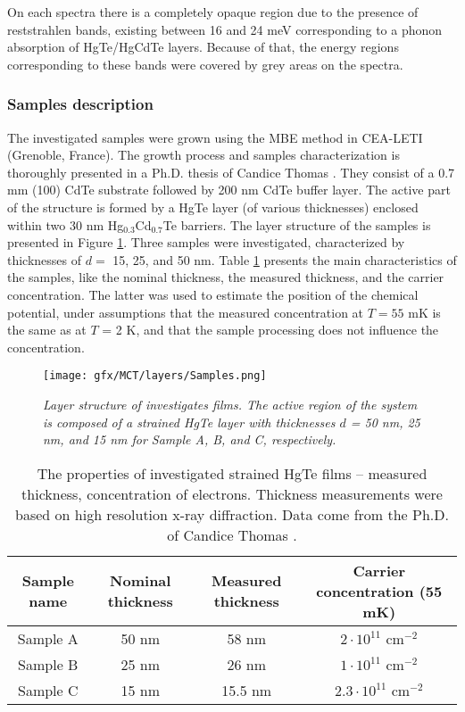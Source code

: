 \documentclass[titlepage,a4paper]{book}
\newcommand{\wciecie}{\quad\phantom{v}}
\begin{document}
On each spectra there is a completely opaque region due to the presence of reststrahlen bands, existing between 16 and 24 meV corresponding to a phonon absorption of HgTe/HgCdTe layers.  Because of that, the energy regions corresponding to these bands were covered by grey areas on the spectra.
 
\subsubsection{Samples description}
\wciecie
The investigated samples were grown using the MBE method in CEA-LETI (Grenoble, France). The growth process and samples characterization is thoroughly presented in a Ph.D. thesis of Candice Thomas \cite{Thomas_PhD}. They consist of a 0.7 mm (100) CdTe substrate followed by 200 nm CdTe buffer layer. The active part of the structure is formed by a HgTe layer (of various thicknesses) enclosed within two 30 nm Hg$_{0.3}$Cd$_{0.7}$Te barriers. The layer structure of the samples is presented in Figure \ref{fig:Samples_layers}. Three samples were investigated, characterized by thicknesses of $d =$ 15, 25, and 50 nm. Table \ref{tab:MCT_films_properties} presents the main characteristics of the samples, like the nominal thickness, the measured thickness, and the carrier concentration. The latter was used to estimate the position of the chemical potential, under assumptions that the measured concentration at $T = 55$ mK is the same as at $T$ = 2 K, and that the sample processing does not influence the concentration.

\begin{figure}[ht]
	\centering
	\texttt{[image: gfx/MCT/layers/Samples.png]}
	\vspace{-10pt}
	\caption{\textit{Layer structure of investigates films. The active region of the system is composed of a strained HgTe layer with thicknesses $d$ = 50 nm, 25 nm, and 15 nm for Sample A, B, and C, respectively.}}
	\label{fig:Samples_layers}
\end{figure} 

\begin{table}[H]
\label{tab:MCT_films_properties}
\caption{The properties of investigated strained HgTe films -- measured thickness, concentration of electrons. Thickness measurements were based on high resolution x-ray diffraction. Data come from the Ph.D. of Candice Thomas \cite{Thomas_PhD}.}
\vspace{10pt}
\centering
\begin{tabular}{ c | c | c | c}
\textbf{Sample name} & \textbf{Nominal thickness} & \textbf{Measured thickness} & \textbf{Carrier concentration (55 mK)}\\
\hline\hline
Sample A & 50 nm & 58 nm & $2\cdot10^{11}$ cm$^{-2}$\\ \hline
Sample B & 25 nm & 26 nm & $1\cdot10^{11}$ cm$^{-2}$\\ \hline
Sample C & 15 nm & 15.5 nm & $2.3\cdot10^{11}$ cm$^{-2}$\\ \hline
\hline 
\end{tabular}
\end{table}
\end{document}
